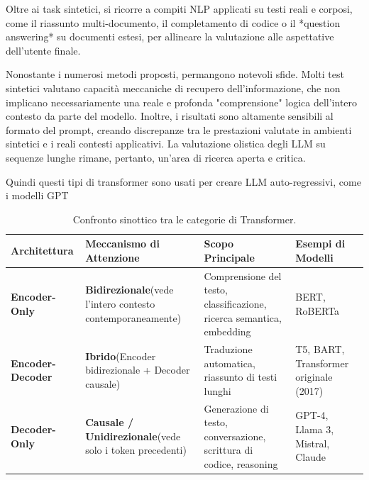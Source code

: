 Oltre ai task sintetici, si ricorre a compiti NLP applicati su testi reali e corposi, come il riassunto multi-documento, il completamento di codice o il *question answering* su documenti estesi, per allineare la valutazione alle aspettative dell'utente finale.

Nonostante i numerosi metodi proposti, permangono notevoli sfide. Molti test sintetici valutano capacità meccaniche di recupero dell'informazione, che non implicano necessariamente una reale e profonda "comprensione" logica dell'intero contesto da parte del modello. Inoltre, i risultati sono altamente sensibili al formato del prompt, creando discrepanze tra le prestazioni valutate in ambienti sintetici e i reali contesti applicativi. La valutazione olistica degli LLM su sequenze lunghe rimane, pertanto, un'area di ricerca aperta e critica.


Quindi questi tipi di transformer sono usati per creare LLM auto-regressivi, come i modelli GPT

\renewcommand{\arraystretch}{1.45}
\begin{table}[h!]
\centering
\begin{tabularx}{\textwidth}{>{\bfseries}l X X X}
\hline
\rowcolor{headerbg}
\textbf{Architettura} & \textbf{Meccanismo di Attenzione} & \textbf{Scopo Principale} & \textbf{Esempi di Modelli} \\
\hline
Encoder-Only & 
  \textbf{Bidirezionale}\newline (vede l'intero contesto contemporaneamente) & 
  Comprensione del testo, classificazione, ricerca semantica, embedding & 
  BERT, RoBERTa \\
\rowcolor{altrow}
Encoder-Decoder & 
  \textbf{Ibrido}\newline (Encoder bidirezionale + Decoder causale) & 
  Traduzione automatica, riassunto di testi lunghi & 
  T5, BART, Transformer originale (2017) \\
Decoder-Only & 
  \textbf{Causale / Unidirezionale}\newline (vede solo i token precedenti) & 
  Generazione di testo, conversazione, scrittura di codice, reasoning & 
  GPT-4, Llama 3, Mistral, Claude \\
\hline
\end{tabularx}
\caption{Confronto sinottico tra le categorie di Transformer.}
\label{tab:transformer-comparison}
\end{table}